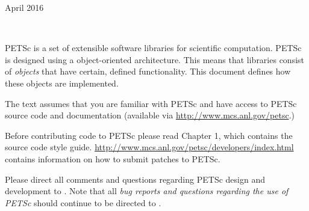 \documentclass[twoside,12pt]{../sty/report_petsc}
\begin{document}
{}{April 2016}

\newpage

\hbox{ }

\vspace{1in}
\date{\today}


\newpage




\medskip \medskip


%
%

\medskip \medskip
PETSc is
a set of extensible software libraries for scientific computation.
PETSc is designed using a object-oriented
architecture. This means that libraries consist of {\em objects} that
have certain, defined functionality. This document defines how these
objects are implemented.

The text assumes
that you are familiar with PETSc and have access to PETSc source code and documentation
(available via \href{http://www.mcs.anl.gov/petsc}{http://www.mcs.anl.gov/petsc}.)

Before contributing code to PETSc please read Chapter 1, which contains the source code style guide.
\href{http://www.mcs.anl.gov/petsc/developers/index.html}{http://www.mcs.anl.gov/petsc/developers/index.html}
contains information on how to submit patches to PETSc.

\vspace{1cm}

Please direct all comments and questions regarding PETSc design and
development to .  Note that all {\em
bug reports and questions regarding the use of PETSc} should continue
to be directed to .

%
%

\newpage
\hbox{ }
\newpage
\end{document}
